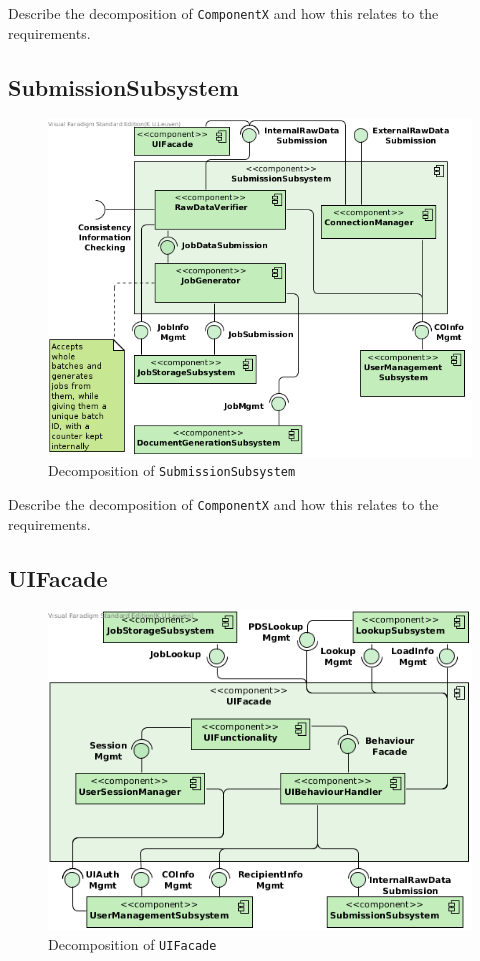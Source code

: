 Describe the decomposition of \texttt{ComponentX} and how this relates to the
requirements.

\subsection{SubmissionSubsystem}
\begin{figure}[!htp]
    \centering
    \includegraphics[width=\textwidth]{figures/Submission Subsystem.png}
    \caption{Decomposition of \texttt{SubmissionSubsystem}}\label{fig:decomp-submsub}
\end{figure}

Describe the decomposition of \texttt{ComponentX} and how this relates to the
requirements.

\subsection{UIFacade}
\begin{figure}[!htp]
    \centering
    \includegraphics[width=\textwidth]{figures/UI Facade.png}
    \caption{Decomposition of \texttt{UIFacade}}\label{fig:decomp-uif}
\end{figure}

